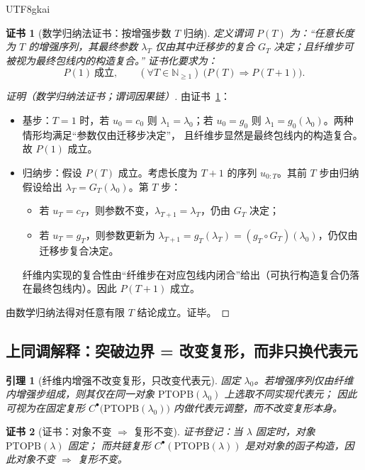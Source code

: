 \documentclass[12pt]{article}
\newtheorem{lemma}{引理}[section]
\newtheorem{Certificate}{证书}[section]
\newcommand{\NN}{\mathbb{N}}
\newcommand{\PTOPB}{\ensuremath{\mathrm{PTOPB}}}
\begin{document}
\begin{CJK*}{UTF8}{gkai}
\begin{Certificate}[数学归纳法证书：按增强步数 $T$ 归纳]
\label{cert:two-level-augmentation-decomposition}
定义谓词 $P(T)$ 为：“任意长度为 $T$ 的增强序列，其最终参数 $\lambda_T$ 仅由其中迁移步的复合 $G_T$ 决定；且纤维步可被视为最终包线内的构造复合。”
证书化要求为：
\[
  P(1)\ \text{成立},\qquad
  (\forall T\in\NN_{\ge 1})\ \bigl(P(T)\Rightarrow P(T+1)\bigr).
\]
\end{Certificate}

\begin{proof}[证明（数学归纳法证书；谓词因果链）]
由证书~\ref{cert:two-level-augmentation-decomposition}：
\begin{itemize}
  \item 基步：$T=1$ 时，若 $u_0=c_0$ 则 $\lambda_1=\lambda_0$；若 $u_0=g_0$ 则 $\lambda_1=g_0(\lambda_0)$。两种情形均满足“参数仅由迁移步决定”，
    且纤维步显然是最终包线内的构造复合。故 $P(1)$ 成立。
  \item 归纳步：假设 $P(T)$ 成立。考虑长度为 $T+1$ 的序列 $u_{0:T}$。其前 $T$ 步由归纳假设给出
  $\lambda_T = G_T(\lambda_0)$。第 $T$ 步：
  \begin{itemize}
    \item 若 $u_T=c_T$，则参数不变，$\lambda_{T+1}=\lambda_T$，仍由 $G_T$ 决定；
    \item 若 $u_T=g_T$，则参数更新为 $\lambda_{T+1}=g_T(\lambda_T)=(g_T\circ G_T)(\lambda_0)$，仍仅由迁移步复合决定。
  \end{itemize}
  纤维内实现的复合性由“纤维步在对应包线内闭合”给出（可执行构造复合仍落在最终包线内）。因此 $P(T+1)$ 成立。
\end{itemize}
由数学归纳法得对任意有限 $T$ 结论成立。证毕。
\end{proof}

\subsection{上同调解释：突破边界 = 改变复形，而非只换代表元}
\label{sec:cohomology-interpretation-boundary-shift}

\begin{lemma}[纤维内增强不改变复形，只改变代表元]
\label{lem:fiber-augmentation-does-not-change-complex}
固定 $\lambda_0$。若增强序列仅由纤维内增强步组成，则其仅在同一对象 $\PTOPB(\lambda_0)$ 上选取不同实现代表元；
因此可视为在固定复形 $C^\bullet\bigl(\PTOPB(\lambda_0)\bigr)$ 内做代表元调整，而不改变复形本身。
\end{lemma}

\begin{Certificate}[证书：对象不变 $\Rightarrow$ 复形不变]
\label{cert:fiber-augmentation-does-not-change-complex}
证书登记：当 $\lambda$ 固定时，对象 $\PTOPB(\lambda)$ 固定；
而共链复形 $C^\bullet(\PTOPB(\lambda))$ 是对对象的函子构造，因此对象不变 $\Rightarrow$ 复形不变。
\end{Certificate}


\end{CJK*}
\end{document}

